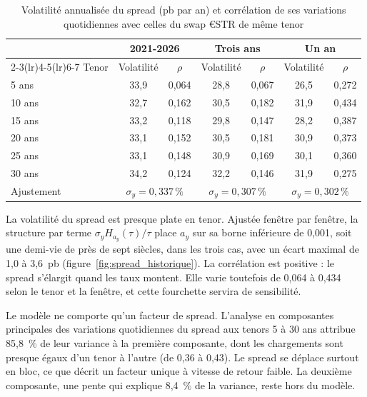 \begin{table}[htbp]
\centering\small
\caption{Volatilité annualisée du spread (pb par an) et corrélation de ses variations quotidiennes avec celles
du swap €STR de même tenor}
\label{tab:vol_spread}
\begin{tabular}{@{}lcccccc@{}}
\toprule
 & \multicolumn{2}{c}{2021-2026} & \multicolumn{2}{c}{Trois ans} & \multicolumn{2}{c}{Un an} \\
\cmidrule(lr){2-3}\cmidrule(lr){4-5}\cmidrule(lr){6-7}
Tenor & Volatilité & $\rho$ & Volatilité & $\rho$ & Volatilité & $\rho$ \\
\midrule
5 ans  & 33,9 & 0,064 & 28,8 & 0,067 & 26,5 & 0,272 \\
10 ans & 32,7 & 0,162 & 30,5 & 0,182 & 31,9 & 0,434 \\
15 ans & 33,2 & 0,118 & 29,8 & 0,147 & 28,2 & 0,387 \\
20 ans & 33,1 & 0,152 & 30,5 & 0,181 & 30,9 & 0,373 \\
25 ans & 33,1 & 0,148 & 30,9 & 0,169 & 30,1 & 0,360 \\
30 ans & 34,2 & 0,124 & 32,2 & 0,146 & 31,9 & 0,275 \\
\midrule
Ajustement & \multicolumn{2}{c}{$\sigma_y = 0{,}337\,\%$} & \multicolumn{2}{c}{$\sigma_y = 0{,}307\,\%$} & \multicolumn{2}{c}{$\sigma_y = 0{,}302\,\%$} \\
\bottomrule
\end{tabular}
\end{table}

La volatilité du spread est presque plate en tenor. Ajustée fenêtre par fenêtre, la structure par terme
$\sigma_y H_{a_y}(\tau)/\tau$ place $a_y$ sur sa borne inférieure de 0,001, soit une demi-vie de près de sept
siècles, dans les trois cas, avec un écart maximal de 1,0 à 3,6~pb (figure~\ref{fig:spread_historique}). La
corrélation est positive : le spread s'élargit quand les taux montent. Elle varie toutefois de 0,064 à 0,434
selon le tenor et la fenêtre, et cette fourchette servira de sensibilité.

Le modèle ne comporte qu'un facteur de spread. L'analyse en composantes principales des variations quotidiennes
du spread aux tenors 5 à 30 ans attribue 85,8~\% de leur variance à la première composante, dont les chargements
sont presque égaux d'un tenor à l'autre (de 0,36 à 0,43). Le spread se déplace surtout en bloc, ce que décrit
un facteur unique à vitesse de retour faible. La deuxième composante, une pente qui explique 8,4~\% de la variance,
reste hors du modèle.

